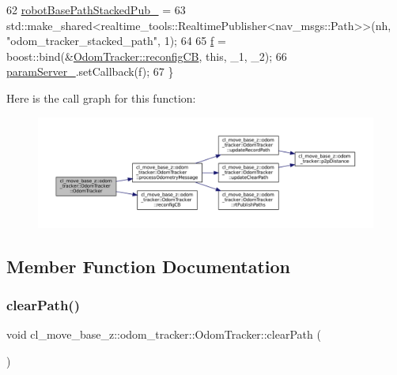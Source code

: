 \begin{DoxyCode}
62   \hyperlink{classcl__move__base__z_1_1odom__tracker_1_1OdomTracker_a7a2fb23e835ba7d63e69c8db819be876}{robotBasePathStackedPub\_} =
63       std::make\_shared<realtime\_tools::RealtimePublisher<nav\_msgs::Path>>(nh, \textcolor{stringliteral}{"odom\_tracker\_stacked\_path"}, 
      1);
64 
65   \hyperlink{classcl__move__base__z_1_1odom__tracker_1_1OdomTracker_a391e33cf5482697b32665fcc7c4d87e4}{f} = boost::bind(&\hyperlink{classcl__move__base__z_1_1odom__tracker_1_1OdomTracker_adb06a17455b8d545034d8845706e2886}{OdomTracker::reconfigCB}, \textcolor{keyword}{this}, \_1, \_2);
66   \hyperlink{classcl__move__base__z_1_1odom__tracker_1_1OdomTracker_a8bee0a1a49b5f736a7d7a741e56f7b02}{paramServer\_}.setCallback(f);
67 \}
\end{DoxyCode}
Here is the call graph for this function\+:
\nopagebreak
\begin{figure}[H]
\begin{center}
\leavevmode
\includegraphics[width=350pt]{classcl__move__base__z_1_1odom__tracker_1_1OdomTracker_a99e1f405d0b3ec3e9fc73e666793c409_cgraph}
\end{center}
\end{figure}


\subsection{Member Function Documentation}
\mbox{\label{classcl__move__base__z_1_1odom__tracker_1_1OdomTracker_a93a14e15e3e623f530e056f403bf7644}} 
\subsubsection{\texorpdfstring{clear\+Path()}{clearPath()}}
{\footnotesize\ttfamily void cl\+\_\+move\+\_\+base\+\_\+z\+::odom\+\_\+tracker\+::\+Odom\+Tracker\+::clear\+Path (\begin{DoxyParamCaption}{ }\end{DoxyParamCaption})}



